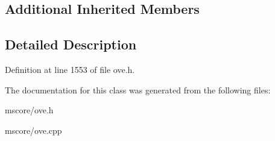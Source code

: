\subsection*{Additional Inherited Members}


\subsection{Detailed Description}


Definition at line 1553 of file ove.\+h.



The documentation for this class was generated from the following files\+:\begin{DoxyCompactItemize}
\item 
mscore/ove.\+h\item 
mscore/ove.\+cpp\end{DoxyCompactItemize}
